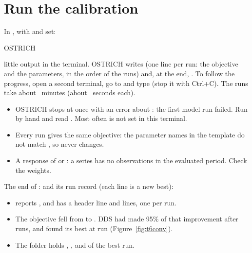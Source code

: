 \section{Run the calibration}

In , with  and  set:
\begin{shell}
$ $OSTRICH
\end{shell}
\see little output in the terminal. OSTRICH writes  (one line per run: the objective and the
parameters, in the order of the runs) and, at the end, . To follow the progress, open a second
terminal, go to  and type  (stop it with Ctrl+C). The  runs take
about ~minutes (about ~seconds each).
\begin{trouble}
\begin{itemize}
\item OSTRICH stops at once with an error about : the first model run failed. Run
   by hand and read . Most often  is not set in this
  terminal.
\item Every run gives the same objective: the parameter names in the template do not match , so
   never changes.
\item A response of  or : a series has no observations in the evaluated period. Check the weights.
\end{itemize}
\end{trouble}

The end of :
and its run record (each line is a new best):
\begin{tocheck}
\begin{itemize}
\item {} reports , and  has a header line and
   lines, one per run.
\item The objective fell from  to . DDS had made 95\% of that improvement after
   runs, and found its best at run  (Figure~\ref{fig:t6conv}).
\item The folder  holds , ,  and  of
  the best run.
\end{itemize}
\end{tocheck}
